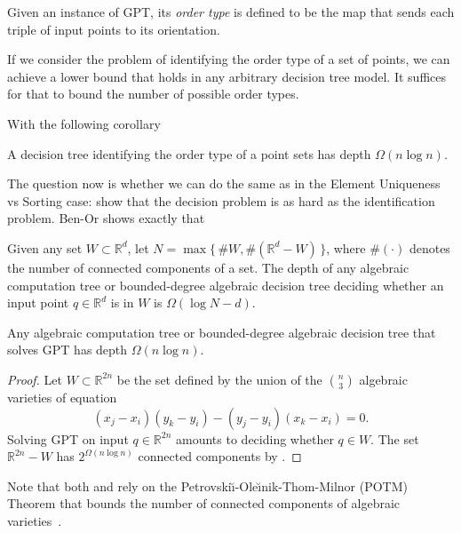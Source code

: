 Given an instance of GPT, its \emph{order type} is defined to be the map that
sends each triple of input points to its orientation.
%

%
If we consider the problem of identifying the order type of a set of points, we
can achieve a lower bound that holds in any arbitrary decision tree model. It
suffices for that to bound the number of possible order types.
%

%
With the following corollary
\begin{corollary}
    A decision tree identifying the order type of a point sets has depth
    \(\Omega(n \log n)\).
\end{corollary}

The question now is whether we can do the same as in the Element Uniqueness vs
Sorting case: show that the decision problem is as hard as the identification
problem. Ben-Or shows exactly that
%
\begin{theorem}[name=Ben-Or~\cite{Be83},label=thm:Be83]
    Given any set \(W \subset \mathbb{R}^d\),
    let \(N = \max \{\, \# W , \#(\mathbb{R}^d - W)\,\}\),
    where \(\#(\cdot)\) denotes the number of connected components of a set.
    The depth of any algebraic
    computation tree or bounded-degree algebraic decision tree
    deciding whether an input point \(q \in \mathbb{R}^d\) is in \(W\)
    is \(\Omega(\log N - d)\).
\end{theorem}

\begin{corollary}
    Any algebraic computation tree or bounded-degree algebraic decision tree
    that solves GPT has depth \(\Omega(n \log n)\).
\end{corollary}

\begin{proof}
    Let \(W \subset \mathbb{R}^{2n}\) be the set defined by the union of the
    \(n \choose 3\) algebraic varieties of equation
    \begin{displaymath}
	(x_j - x_i)(y_k - y_i) - (y_j - y_i)(x_k - x_i) = 0.
    \end{displaymath}
    Solving GPT on input \(q \in \mathbb{R}^{2n}\)
    amounts to deciding whether \(q \in W\).
    The set \(\mathbb{R}^{2n} - W\) has \(2^{\Omega(n \log n)}\) connected
    components by
    .
\end{proof}

Note that both
and
 rely on
the
Petrovski\u{\i}-Ole\u{\i}nik-Thom-Milnor (POTM) Theorem that
bounds the number of connected components of
algebraic varieties~\cite{Mi64,Th65,BPR06}.

